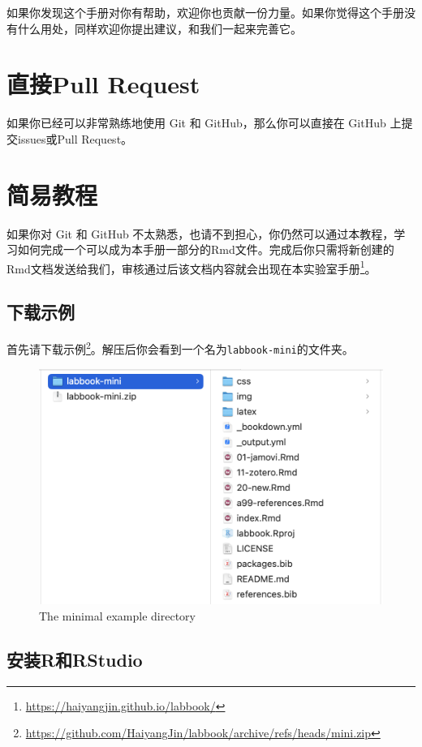 \documentclass[]{ctexbook}
\renewcommand{\href}[2]{#2\footnote{\url{#1}}}
\theoremstyle{definition}
\theoremstyle{definition}
\theoremstyle{definition}
\theoremstyle{definition}
\theoremstyle{remark}
\begin{document}
如果你发现这个手册对你有帮助，欢迎你也贡献一份力量。如果你觉得这个手册没有什么用处，同样欢迎你提出建议，和我们一起来完善它。

\section{直接Pull Request}\label{ux76f4ux63a5pull-request}

如果你已经可以非常熟练地使用 Git 和 GitHub，那么你可以直接在 GitHub 上提交issues或Pull Request。

\section{简易教程}\label{ux7b80ux6613ux6559ux7a0b}

如果你对 Git 和 GitHub 不太熟悉，也请不到担心，你仍然可以通过本教程，学习如何完成一个可以成为本手册一部分的Rmd文件。完成后你只需将新创建的Rmd文档发送给我们，审核通过后该文档内容就会出现在\href{https://haiyangjin.github.io/labbook/}{本实验室手册}。

\subsection{下载示例}\label{ux4e0bux8f7dux793aux4f8b}

首先请下载\href{https://github.com/HaiyangJin/labbook/archive/refs/heads/mini.zip}{示例}。解压后你会看到一个名为\texttt{labbook-mini}的文件夹。

\begin{figure}

{\centering \includegraphics[width=0.7\linewidth]{img/contribute/mini_dir} 

}

\caption{The minimal example directory}\label{fig:contri-mini-dir}
\end{figure}

\subsection{安装R和RStudio}\label{ux5b89ux88c5rux548crstudio}
\end{document}
